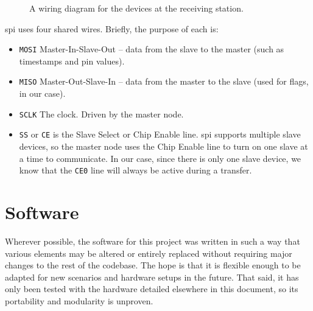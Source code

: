 \documentclass[12pt]{article}
\begin{document}
\begin{figure}[h]
\begin{center}
\end{center}
\caption{A wiring diagram for the devices at the receiving station.}
\label{fig:wiring}
\end{figure}

\gls{spi} uses four shared wires. Briefly, the purpose of each is:
\begin{itemize}
\item \texttt{MOSI} Master-In-Slave-Out -- data from the slave to the
	master (such as timestamps and pin values).
\item \texttt{MISO} Master-Out-Slave-In -- data from the master to the
	slave (used for flags, in our case).
\item \texttt{SCLK} The clock. Driven by the master node.
\item \texttt{SS} or \texttt{CE} is the Slave Select or Chip Enable line.
	\gls{spi} supports multiple slave devices, so the master node uses
	the Chip Enable line to turn on one slave at a time to communicate.
	In our case, since there is only one slave device, we know that the
	\texttt{CE0} line will always be active during a transfer.
\end{itemize}


\section{Software}\label{sec:software}

Wherever possible, the software for this project was written in such a way that
various elements may be altered or entirely replaced without requiring major
changes to the rest of the codebase.
The hope is that it is flexible enough to be adapted for new scenarios and
hardware setups in the future.
That said, it has only been tested with the hardware detailed elsewhere in this
document, so its portability and modularity is unproven.
\end{document}
